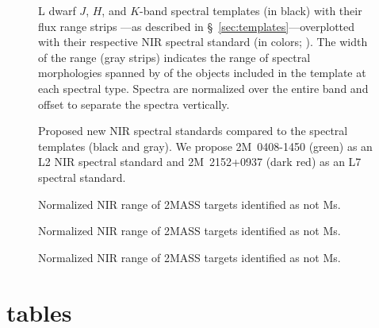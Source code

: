 \documentclass[12pt,preprint]{aastex}
\begin{document}
\clearpage

\begin{figure}
		\caption{
	L dwarf $J$, $H$, and $K$-band spectral templates (in black) with their flux range strips ---as described in \S~\ref{sec:templates}---overplotted with their respective NIR spectral standard (in colors; \cite{Kirkpatrick10}). 
	The width of the range (gray strips) indicates the range of spectral morphologies spanned by of the objects included in the template at each spectral type.
	Spectra are normalized over the entire band and offset to separate the spectra vertically.
	}
	\label{fig:templates-stds}
\end{figure}

\begin{figure}
		\caption{Proposed new NIR spectral standards compared to the spectral templates (black and gray).
		We propose 2M~0408-1450 (green) as an L2 NIR spectral standard and 2M~2152+0937 (dark red) as an L7 spectral standard.
		}
	\label{fig:templates-newstds}
\end{figure}


\begin{figure}
	\caption{Normalized NIR range of 2MASS targets identified as not Ms.}
	\label{fig:notMs_1}
\end{figure}

\begin{figure}
	\caption{Normalized NIR range of 2MASS targets identified as not Ms.}
\end{figure}

\begin{figure}
	\caption{Normalized NIR range of 2MASS targets identified as not Ms.}
\end{figure}

\clearpage

\section{tables}
\end{document}
